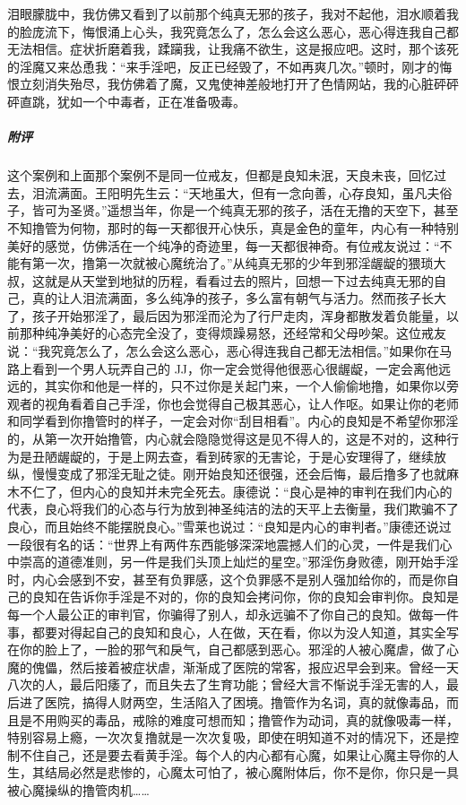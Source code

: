 \begin{case}
    泪眼朦胧中，我仿佛又看到了以前那个纯真无邪的孩子，我对不起他，泪水顺着我的脸庞流下，悔恨涌上心头，我究竟怎么了，怎么会这么恶心，恶心得连我自己都无法相信。症状折磨着我，蹂躏我，让我痛不欲生，这是报应吧。这时，那个该死的淫魔又来怂恿我：“来手淫吧，反正已经毁了，不如再爽几次。”顿时，刚才的悔恨立刻消失殆尽，我仿佛着了魔，又鬼使神差般地打开了色情网站，我的心脏砰砰砰直跳，犹如一个中毒者，正在准备吸毒。
    \subparagraph{附评} 这个案例和上面那个案例不是同一位戒友，但都是良知未泯，天良未丧，回忆过去，泪流满面。王阳明先生云：“天地虽大，但有一念向善，心存良知，虽凡夫俗子，皆可为圣贤。”遥想当年，你是一个纯真无邪的孩子，活在无撸的天空下，甚至不知撸管为何物，那时的每一天都很开心快乐，真是金色的童年，内心有一种特别美好的感觉，仿佛活在一个纯净的奇迹里，每一天都很神奇。有位戒友说过：“不能有第一次，撸第一次就被心魔统治了。”从纯真无邪的少年到邪淫龌龊的猥琐大叔，这就是从天堂到地狱的历程，看看过去的照片，回想一下过去纯真无邪的自己，真的让人泪流满面，多么纯净的孩子，多么富有朝气与活力。然而孩子长大了，孩子开始邪淫了，最后因为邪淫而沦为了行尸走肉，浑身都散发着负能量，以前那种纯净美好的心态完全没了，变得烦躁易怒，还经常和父母吵架。这位戒友说：“我究竟怎么了，怎么会这么恶心，恶心得连我自己都无法相信。”如果你在马路上看到一个男人玩弄自己的 JJ，你一定会觉得他很恶心很龌龊，一定会离他远远的，其实你和他是一样的，只不过你是关起门来，一个人偷偷地撸，如果你以旁观者的视角看着自己手淫，你也会觉得自己极其恶心，让人作呕。如果让你的老师和同学看到你撸管时的样子，一定会对你“刮目相看”。内心的良知是不希望你邪淫的，从第一次开始撸管，内心就会隐隐觉得这是见不得人的，这是不对的，这种行为是丑陋龌龊的，于是上网去查，看到砖家的无害论，于是心安理得了，继续放纵，慢慢变成了邪淫无耻之徒。刚开始良知还很强，还会后悔，最后撸多了也就麻木不仁了，但内心的良知并未完全死去。康德说：“良心是神的审判在我们内心的代表，良心将我们的心态与行为放到神圣纯洁的法的天平上去衡量，我们欺骗不了良心，而且始终不能摆脱良心。”雪莱也说过：“良知是内心的审判者。”康德还说过一段很有名的话：“世界上有两件东西能够深深地震撼人们的心灵，一件是我们心中崇高的道德准则，另一件是我们头顶上灿烂的星空。”邪淫伤身败德，刚开始手淫时，内心会感到不安，甚至有负罪感，这个负罪感不是别人强加给你的，而是你自己的良知在告诉你手淫是不对的，你的良知会拷问你，你的良知会审判你。良知是每一个人最公正的审判官，你骗得了别人，却永远骗不了你自己的良知。做每一件事，都要对得起自己的良知和良心，人在做，天在看，你以为没人知道，其实全写在你的脸上了，一脸的邪气和戾气，自己都感到恶心。邪淫的人被心魔虐，做了心魔的傀儡，然后接着被症状虐，渐渐成了医院的常客，报应迟早会到来。曾经一天八次的人，最后阳痿了，而且失去了生育功能；曾经大言不惭说手淫无害的人，最后进了医院，搞得人财两空，生活陷入了困境。撸管作为名词，真的就像毒品，而且是不用购买的毒品，戒除的难度可想而知；撸管作为动词，真的就像吸毒一样，特别容易上瘾，一次次复撸就是一次次复吸，即使在明知道不对的情况下，还是控制不住自己，还是要去看黄手淫。每个人的内心都有心魔，如果让心魔主导你的人生，其结局必然是悲惨的，心魔太可怕了，被心魔附体后，你不是你，你只是一具被心魔操纵的撸管肉机……
\end{case}

